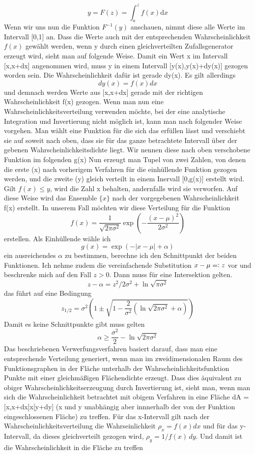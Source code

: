 \documentclass[12pt]{article}
\begin{document}
$$y=F(z)=\int_a^zf(x)\text{d}x$$
Wenn wir uns nun die Funktion $F^{-1}(y)$ anschauen, nimmt diese alle Werte im Intervall [0,1] an. Dass die Werte auch mit der entsprechenden Wahrscheinlichkeit $f(x)$ gewählt werden, wenn y durch einen gleichverteilten Zufallsgenerator erzeugt wird, sieht man auf folgende Weise. Damit ein Wert x im Intervall [x,x+dx] angenommen wird, muss y in einem Intervall [y(x),y(x)+dy(x)] gezogen worden sein. Die Wahrscheinlichkeit dafür ist gerade dy(x). Es gilt allerdings
$$dy(x)=f(x)dx$$
und demnach werden Werte aus [x,x+dx] gerade mit der richtigen Wahrscheinlichkeit f(x) gezogen. Wenn man nun eine Wahrscheinlichkeitsverteilung verwenden möchte, bei der eine analytische Integration und Invertierung nicht möglich ist, kann man nach folgender Weise vorgehen. Man wählt eine Funktion für die sich das erfüllen lässt und verschiebt sie auf soweit nach oben, dass sie für das ganze betrachtete Intervall über der gebenen Wahrscheinlichkeitsdichte liegt. Wir nennen diese nach oben verschobene Funktion im folgenden g(x) Nun erzeugt man Tupel von zwei Zahlen, von denen die erste (x) nach vorherigem Verfahren für die einhüllende Funktion gezogen werden, und die zweite (y) gleich verteilt in einem Inervall [0,g(x)] erstellt wird. Gilt $f(x)\leq y$, wird die Zahl x behalten, andernfalls wird sie verworfen. Auf diese Weise wird das Ensemble $\{x\}$ nach der vorgegebenen Wahrscheinlichkeit f(x) erstellt.
In unserem Fall möchten wir diese Verteilung für die Funktion 
$$f(x)=\frac{1}{\sqrt{2\pi\sigma^2}}\exp(-\frac{(x-\mu)^2}{2\sigma^2})$$
erstellen. Als Einhüllende wähle ich
$$g(x)=\exp(-|x-\mu|+\alpha)$$ ein ausreichendes $\alpha$ zu bestimmen, berechne ich den Schnittpunkt der beiden Funktionen. Ich nehme zudem die vereinfachende Substitution $x-\mu=\vcentcolon{z}$ vor und beschrenke mich auf den Fall $z>0$. Dann muss für eine Intersektion gelten.
$$z-\alpha=z^2/2\sigma^2+\ln{\sqrt{\pi\sigma^2}}$$
das führt auf eine Bedingung 
$$z_{1/2}=\sigma^2\left(1\pm\sqrt{1-\frac{2}{\sigma^2}(\ln{\sqrt{2\pi\sigma^2}}+\alpha)}\right)$$
Damit es keine Schnittpunkte gibt muss gelten
$$\alpha\geq\frac{\sigma^2}{2}-\ln{\sqrt{2\pi\sigma^2}}$$
Das beschriebenen Verwerfungsverfahren basiert darauf, dass man eine entsprechende Verteilung generiert, wenn man im zweidimensionalen Raum des Funktionsgraphen in der Fläche unterhalb der Wahrscheinlichkeitsfunktion Punkte mit einer gleichmäßigen Flächendichte erzeugt. Dass dies äquivalent zu obiger Wahrscheinlichkeitserzeugung durch Invertierung ist, sieht man, wenn man sich die Wahrscheinlichkeit betrachtet mit obigem Verfahren in eine Fläche dA = [x,x+dx]x[y+dy] (x und y unabhängig aber innnerhalb der von der Funktion eingeschlossenen Fläche) zu treffen. Für das x-Intervall gilt nach der Wahrscheinlichkeitsverteilung die Wahrseinlichkeit $\rho_x=f(x)dx$ und für das y-Intervall, da dieses gleichverteilt gezogen wird, $\rho_y=1/f(x)\,dy$. Und damit ist die Wahrscheinlichkeit in die Fläche zu treffen
\end{document}

